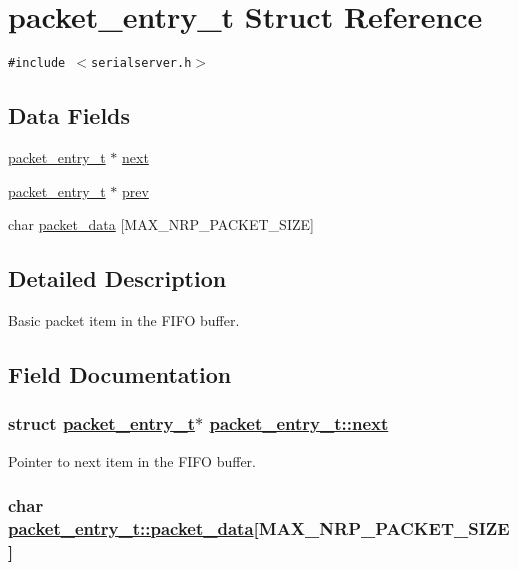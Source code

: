 \hypertarget{structpacket__entry__t}{
\section{packet\_\-entry\_\-t Struct Reference}
\label{structpacket__entry__t}
}
{\tt \#include $<$serialserver.h$>$}

\subsection*{Data Fields}
\begin{CompactItemize}
\item 
\hyperlink{structpacket__entry__t}{packet\_\-entry\_\-t} $\ast$ \hyperlink{structpacket__entry__t_3fe6dc267e444e95acf382b9844cecaf}{next}
\item 
\hyperlink{structpacket__entry__t}{packet\_\-entry\_\-t} $\ast$ \hyperlink{structpacket__entry__t_bf2385bedd4ae2af115b923f29c8ec5d}{prev}
\item 
char \hyperlink{structpacket__entry__t_a4ed47e0ce37602056f98befd3340a42}{packet\_\-data} \mbox{[}MAX\_\-NRP\_\-PACKET\_\-SIZE\mbox{]}
\end{CompactItemize}


\subsection{Detailed Description}
Basic packet item in the FIFO buffer. 



\subsection{Field Documentation}
\hypertarget{structpacket__entry__t_3fe6dc267e444e95acf382b9844cecaf}{
\subsubsection[next]{\setlength{\rightskip}{0pt plus 5cm}struct \hyperlink{structpacket__entry__t}{packet\_\-entry\_\-t}$\ast$ \hyperlink{structpacket__entry__t_3fe6dc267e444e95acf382b9844cecaf}{packet\_\-entry\_\-t::next}}}
\label{structpacket__entry__t_3fe6dc267e444e95acf382b9844cecaf}


Pointer to next item in the FIFO buffer. \hypertarget{structpacket__entry__t_a4ed47e0ce37602056f98befd3340a42}{
\subsubsection[packet\_\-data]{\setlength{\rightskip}{0pt plus 5cm}char \hyperlink{structpacket__entry__t_a4ed47e0ce37602056f98befd3340a42}{packet\_\-entry\_\-t::packet\_\-data}\mbox{[}MAX\_\-NRP\_\-PACKET\_\-SIZE\mbox{]}}}
\label{structpacket__entry__t_a4ed47e0ce37602056f98befd3340a42}


